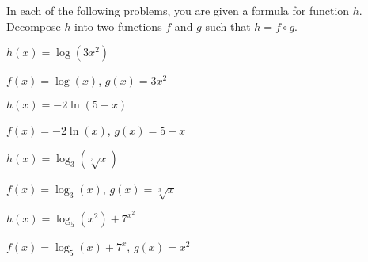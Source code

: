 \begin{exercises}
\begin{problem}[Decomposition]
In each of the following problems, you are given a formula for function  
$h$. Decompose $h$ into two functions $f$ and $g$ such that $h=f\circ g$.
\begin{multicols}{4}
	\begin{subproblem}
		$h(x)=\log(3x^2)$
		\begin{shortsolution}
			$f(x)=\log(x)$, $g(x)=3x^2$
		\end{shortsolution}
	\end{subproblem}
	\begin{subproblem}
		$h(x)=-2\ln(5-x)$
		\begin{shortsolution}
			$f(x)=-2\ln(x)$, $g(x)=5-x$
		\end{shortsolution}
	\end{subproblem}
	\begin{subproblem}
		$h(x)=\log_3\left( \sqrt[3]{x} \right)$
		\begin{shortsolution}
			$f(x)=\log_3(x)$, $g(x)=\sqrt[3]{x}$
		\end{shortsolution}
	\end{subproblem}
	\begin{subproblem}
		$h(x)=\log_5(x^2)+7^{x^2}$
		\begin{shortsolution}
			$f(x)=\log_5(x)+7^x$, $g(x)=x^2$
		\end{shortsolution}
	\end{subproblem}
\end{multicols}
\end{problem}


\end{exercises}
